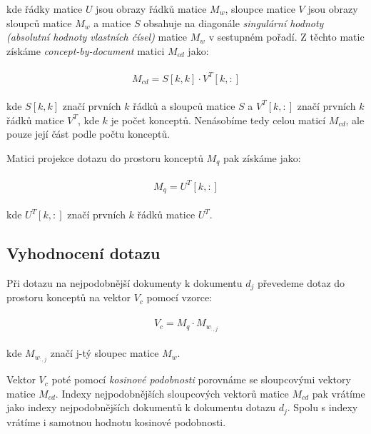 \documentclass[11pt]{scrartcl} %
\begin{document}
kde řádky matice $U$ jsou obrazy řádků matice $M_w$, sloupce matice $V$ jsou obrazy sloupců matice $M_w$ a matice $S$ obsahuje na diagonále \emph{singulární hodnoty (absolutní hodnoty vlastních čísel)} matice $M_w$ v sestupném pořadí. Z těchto matic získáme \emph{concept-by-document} matici $M_{cd}$ jako:

\begin{align}
	\begin{split}
		M_{cd} = S[k,k] \cdot V^T[k,:]
	\end{split}					
\end{align}

kde $S[k,k]$ značí prvních $k$ řádků a sloupců matice $S$ a $V^T[k,:]$ značí prvních $k$ řádků matice $V^T$, kde $k$ je počet konceptů. Nenásobíme tedy celou maticí $M_{cd}$, ale pouze její část podle počtu konceptů.

\bigskip

Matici projekce dotazu do prostoru konceptů $M_q$ pak získáme jako:

\begin{align}
	\begin{split}
		M_q = U^T[k,:]
	\end{split}					
\end{align}

kde $U^T[k,:]$ značí prvních $k$ řádků matice $U^T$.

\subsection{Vyhodnocení dotazu}

Při dotazu na nejpodobnější dokumenty k dokumentu $d_j$ převedeme dotaz do prostoru konceptů na vektor $V_c$ pomocí vzorce:

\begin{align}
	\begin{split}
		V_c = M_q \cdot M_{w_{:,j}}
	\end{split}					
\end{align}

kde $M_{w_{:,j}}$ značí j-tý sloupec matice $M_w$.

\bigskip

Vektor $V_c$ poté pomocí \emph{kosinové podobnosti} porovnáme se sloupcovými vektory matice $M_{cd}$. Indexy nejpodobnějších sloupcových vektorů matice $M_{cd}$ pak vrátíme jako indexy nejpodobnějších dokumentů k dokumentu dotazu $d_j$. Spolu s indexy vrátíme i samotnou hodnotu kosinové podobnosti.
\end{document}
